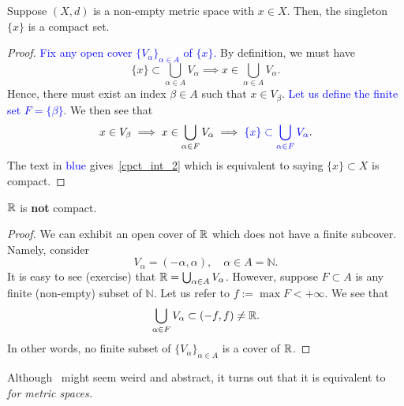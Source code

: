 \begin{eg}
Suppose $(X,d)$ is a non-empty metric space with $x\in X$. Then, the singleton $\{x\}$ is a compact set.
\begin{proof}
	\textcolor{blue}{Fix any open cover $\{V_\alpha\}_{\alpha \in A}$ of $\{x\}$.} By definition, we must have
	\[
	\{x\}\subset \bigcup_{\alpha \in A}V_\alpha \implies x\in \bigcup_{\alpha \in A}V_\alpha.
	\]
	Hence, there must exist an index $\beta\in A$ such that $x \in V_\beta$. \textcolor{blue}{Let us define the finite set $F = \{\beta\}$}. We then see that
	\[
	x \in V_\beta \implies x \in \bigcup_{\alpha \in F}V_\alpha \implies \textcolor{blue}{\{x\}\subset \bigcup_{\alpha \in F}V_\alpha}.
	\]
	The text in \textcolor{blue}{blue} gives~\ref{cpct_int_2} which is equivalent to saying $\{x\}\subset X$ is compact.
\end{proof}
\end{eg}
\begin{eg}
$\mathbb{R}$ is \textbf{not} compact.
\begin{proof}
We can exhibit an open cover of $\mathbb{R}$ which does not have a finite subcover. Namely, consider
\[
V_\alpha = (-\alpha,\alpha),\quad \alpha \in A = \mathbb{N}.
\]
It is easy to see (exercise) that $\mathbb{R} = \bigcup_{\alpha \in A}V_\alpha$. However, suppose $F\subset A$ is any finite (non-empty) subset of $\mathbb{N}$. Let us refer to $f := \max F < +\infty$. We see that
\[
\bigcup_{\alpha \in F}V_\alpha \subset (-f,f) \neq \mathbb{R}.
\]
In other words, no finite subset of $\{V_\alpha\}_{\alpha \in A}$ is a cover of $\mathbb{R}$.
\end{proof}
\end{eg}
Although~ might seem weird and abstract, it turns out that it is equivalent to~ \textit{for metric spaces.}
